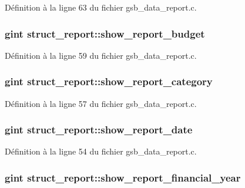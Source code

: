 Définition à la ligne 63 du fichier gsb\_\-data\_\-report.c.

\subsubsection[{show\_\-report\_\-budget}]{\setlength{\rightskip}{0pt plus 5cm}gint {\bf struct\_\-report::show\_\-report\_\-budget}}\label{structstruct__report_aef1b5079ee06d37af113a83601e844b2}


Définition à la ligne 59 du fichier gsb\_\-data\_\-report.c.

\subsubsection[{show\_\-report\_\-category}]{\setlength{\rightskip}{0pt plus 5cm}gint {\bf struct\_\-report::show\_\-report\_\-category}}\label{structstruct__report_ad1bfab29cce74181c5faf8b4f8790463}


Définition à la ligne 57 du fichier gsb\_\-data\_\-report.c.

\subsubsection[{show\_\-report\_\-date}]{\setlength{\rightskip}{0pt plus 5cm}gint {\bf struct\_\-report::show\_\-report\_\-date}}\label{structstruct__report_a1a96c0cdc04ab689c5df492af77e5cd0}


Définition à la ligne 54 du fichier gsb\_\-data\_\-report.c.

\subsubsection[{show\_\-report\_\-financial\_\-year}]{\setlength{\rightskip}{0pt plus 5cm}gint {\bf struct\_\-report::show\_\-report\_\-financial\_\-year}}\label{structstruct__report_a375e949bdae90828bb652998cb069463}


